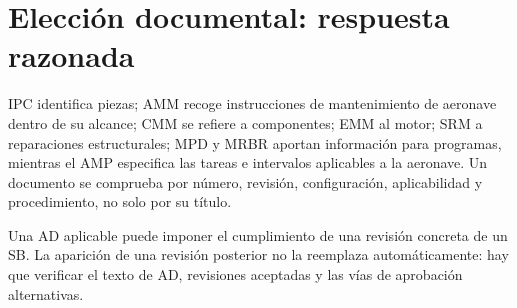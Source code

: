\section{Elección documental: respuesta razonada}
IPC identifica piezas; AMM recoge instrucciones de mantenimiento de aeronave dentro de su alcance; CMM se refiere a componentes; EMM al motor; SRM a reparaciones estructurales; MPD y MRBR aportan información para programas, mientras el AMP especifica las tareas e intervalos aplicables a la aeronave. Un documento se comprueba por número, revisión, configuración, aplicabilidad y procedimiento, no solo por su título.

Una AD aplicable puede imponer el cumplimiento de una revisión concreta de un SB. La aparición de una revisión posterior no la reemplaza automáticamente: hay que verificar el texto de AD, revisiones aceptadas y las vías de aprobación alternativas.


